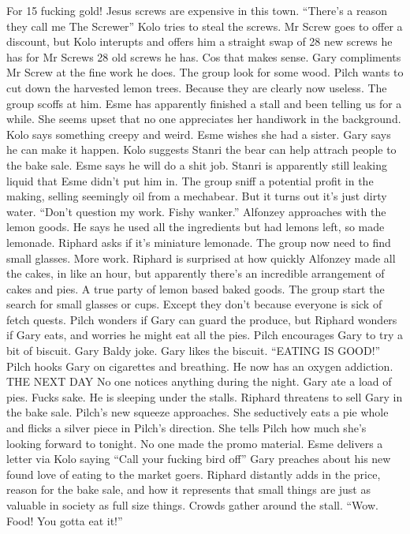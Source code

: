 For 15 fucking gold! Jesus screws are expensive in this town.\medskip
“There’s a reason they call me The Screwer”\medskip
Kolo tries to steal the screws. Mr Screw goes to offer a discount, but Kolo interupts and offers him a straight swap of 28 new screws he has for Mr Screws 28 old screws he has. Cos that makes sense. Gary compliments Mr Screw at the fine work he does.\medskip
The group look for some wood. Pilch wants to cut down the harvested lemon trees. Because they are clearly now useless. The group scoffs at him.\medskip
Esme has apparently finished a stall and been telling us for a while. She seems upset that no one appreciates her handiwork in the background. Kolo says something creepy and weird. Esme wishes she had a sister. Gary says he can make it happen.\medskip
Kolo suggests Stanri the bear can help attrach people to the bake sale. Esme says he will do a shit job. Stanri is apparently still leaking liquid that Esme didn’t put him in. The group sniff a potential profit in the making, selling seemingly oil from a mechabear. But it turns out it’s just dirty water.\medskip
“Don’t question my work. Fishy wanker.”\medskip
Alfonzey approaches with the lemon goods. He says he used all the ingredients but had lemons left, so made lemonade. Riphard asks if it’s miniature lemonade. The group now need to find small glasses. More work. Riphard is surprised at how quickly Alfonzey made all the cakes, in like an hour, but apparently there’s an incredible arrangement of cakes and pies. A true party of lemon based baked goods.\medskip
The group start the search for small glasses or cups. Except they don’t because everyone is sick of fetch quests.\medskip
Pilch wonders if Gary can guard the produce, but Riphard wonders if Gary eats, and worries he might eat all the pies. Pilch encourages Gary to try a bit of biscuit. Gary Baldy joke.\medskip
Gary likes the biscuit. “EATING IS GOOD!”\medskip
Pilch hooks Gary on cigarettes and breathing. He now has an oxygen addiction.\medskip
THE NEXT DAY\medskip
No one notices anything during the night. Gary ate a load of pies. Fucks sake. He is sleeping under the stalls. Riphard threatens to sell Gary in the bake sale.\medskip
Pilch’s new squeeze approaches. She seductively eats a pie whole and flicks a silver piece in Pilch’s direction. She tells Pilch how much she’s looking forward to tonight.\medskip
No one made the promo material. Esme delivers a letter via Kolo saying “Call your fucking bird off”\medskip
Gary preaches about his new found love of eating to the market goers. Riphard distantly adds in the price, reason for the bake sale, and how it represents that small things are just as valuable in society as full size things. Crowds gather around the stall. “Wow. Food! You gotta eat it!”\medskip
